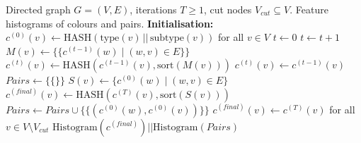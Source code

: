\begin{algorithm}[t]
\small
\caption{\texttt{WLc-n} Algorithm for Feature Extraction.}
\label{alg:wl-cut}
\begin{algorithmic}[1]
\Require Directed graph $G = (V, E)$, iterations $T \geq 1$, cut nodes $V_{cut} \subseteq V$.
\Ensure Feature histograms of colours and pairs.
\State \textbf{Initialisation:} $c^{(0)}(v) \leftarrow \text{HASH}(\text{type}(v) \,||\, \text{subtype}(v))$ for all $v \in V$ \label{algline:init}
\State $t \leftarrow 0$
\Repeat
    \State $t \leftarrow t + 1$
         \label{algline:ifcut}
            \State $M(v) \leftarrow \{\!\!\{c^{(t-1)}(w) \mid (w,v) \in E\}\!\!\}$ \label{algline:agg}
            \State $c^{(t)}(v) \leftarrow \text{HASH}(c^{(t-1)}(v), \text{sort}(M(v)))$ \label{algline:hash}
        \Else
            \State $c^{(t)}(v) \leftarrow c^{(t-1)}(v)$
        \EndIf
    \EndFor
{}
\State $Pairs \leftarrow \{\!\!\{\}\!\!\}$  \label{algline:pairsinit}
 \label{algline:forcut}
    \State $S(v) \leftarrow \{ c^{(0)}(w) \mid (w,v) \in E \}$  \label{algline:set}
    \State $c^{(final)}(v) \leftarrow \text{HASH}(c^{(T)}(v), \text{sort}(S(v)))$ \label{algline:cfinalcut}
     \label{algline:forinw}
        \State $Pairs \leftarrow Pairs \cup \{\!\!\{ (c^{(0)}(w), c^{(0)}(v)) \}\!\!\}$ \label{algline:pairsadd}
    \EndFor
\EndFor
\State $c^{(final)}(v) \leftarrow c^{(T)}(v)$ for all $v \in V \setminus V_{cut}$ \label{algline:cfinalnoncut}
\State \Return $\text{Histogram}(c^{(final)}) \mathbin{||} \text{Histogram}(Pairs)$ \label{algline:return}
\end{algorithmic}
\end{algorithm}

